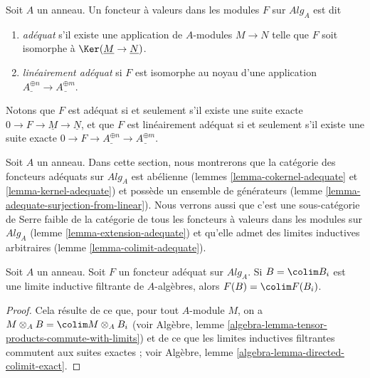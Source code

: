 \begin{definition}
\label{definition-adequate-functor}
Soit $A$ un anneau. Un foncteur à valeurs dans les modules $F$ sur $\textit{Alg}_A$ est
dit
\begin{enumerate}
\item {\it adéquat} s'il existe une
application de $A$-modules $M \to N$ telle que $F$ soit isomorphe à
$\Ker(\underline{M} \to \underline{N})$.
\item {\it linéairement adéquat} si $F$ est isomorphe au
noyau d'une application $\underline{A^{\oplus n}} \to \underline{A^{\oplus m}}$.
\end{enumerate}
\end{definition}

\noindent
Notons que $F$ est adéquat si et seulement s'il existe une
suite exacte $0 \to F \to \underline{M} \to \underline{N}$, et que
$F$ est linéairement adéquat si et seulement s'il existe une suite exacte
$0 \to F \to \underline{A^{\oplus n}} \to \underline{A^{\oplus m}}$.

\medskip\noindent
Soit $A$ un anneau. Dans cette section, nous montrerons que la catégorie des foncteurs
adéquats sur $\textit{Alg}_A$ est abélienne
(lemmes \ref{lemma-cokernel-adequate} et \ref{lemma-kernel-adequate})
et possède un ensemble de générateurs
(lemme \ref{lemma-adequate-surjection-from-linear}).
Nous verrons aussi que c'est une sous-catégorie de Serre faible de la catégorie
de tous les foncteurs à valeurs dans les modules sur $\textit{Alg}_A$
(lemme \ref{lemma-extension-adequate})
et qu'elle admet des limites inductives arbitraires
(lemme \ref{lemma-colimit-adequate}).

\begin{lemma}
\label{lemma-adequate-finite-presentation}
Soit $A$ un anneau.
Soit $F$ un foncteur adéquat sur $\textit{Alg}_A$.
Si $B = \colim B_i$ est une limite inductive
filtrante de $A$-algèbres, alors $F(B) = \colim F(B_i)$.
\end{lemma}

\begin{proof}
Cela résulte de ce que, pour tout $A$-module $M$, on a
$M \otimes_A B = \colim M \otimes_A B_i$ (voir
Algèbre, lemme \ref{algebra-lemma-tensor-products-commute-with-limits})
et de ce que les limites inductives filtrantes commutent aux suites exactes ; voir
Algèbre, lemme \ref{algebra-lemma-directed-colimit-exact}.
\end{proof}

